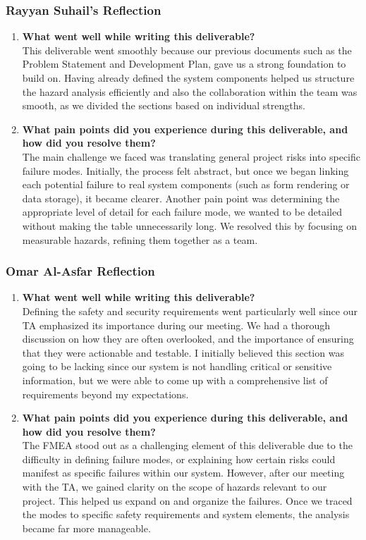 \documentclass[12pt]{article}
\begin{document}
\subsubsection*{Rayyan Suhail's Reflection}
\begin{enumerate}
    \item \textbf{What went well while writing this deliverable?} \\
    This deliverable went smoothly because our previous documents such as the Problem Statement and Development Plan, gave us a strong foundation to build on. Having already defined the system components helped us structure the hazard analysis efficiently and also the collaboration within the team was smooth, as we divided the sections based on individual strengths. 
    \item \textbf{What pain points did you experience during this deliverable, and how did you resolve them?} \\
    The main challenge we faced was translating general project risks into specific failure modes. Initially, the process felt abstract, but once we began linking each potential failure to real system components (such as form rendering or data storage), it became clearer. Another pain point was determining the appropriate level of detail for each failure mode, we wanted to be detailed without making the table unnecessarily long. We resolved this by focusing on measurable hazards, refining them together as a team. 
\end{enumerate}

\subsubsection*{Omar Al-Asfar Reflection}
\begin{enumerate}
    \item \textbf{What went well while writing this deliverable?} \\
    Defining the safety and security requirements went particularly well since our TA emphasized its importance during our meeting. We had a thorough discussion on how they are often overlooked, and the importance of ensuring that they were actionable and testable. I initially believed this section was going to be lacking since our system is not handling critical or sensitive information, but we were able to come up with a comprehensive list of requirements beyond my expectations.
    \item \textbf{What pain points did you experience during this deliverable, and how did you resolve them?} \\
    The FMEA stood out as a challenging element of this deliverable due to the difficulty in defining failure modes, or explaining how certain risks could manifest as specific failures within our system. However, after our meeting with the TA, we gained clarity on the scope of hazards relevant to our project. This helped us expand on and organize the failures. Once we traced the modes to specific safety requirements and system elements, the analysis became far more manageable.
\end{enumerate}
\end{document}
